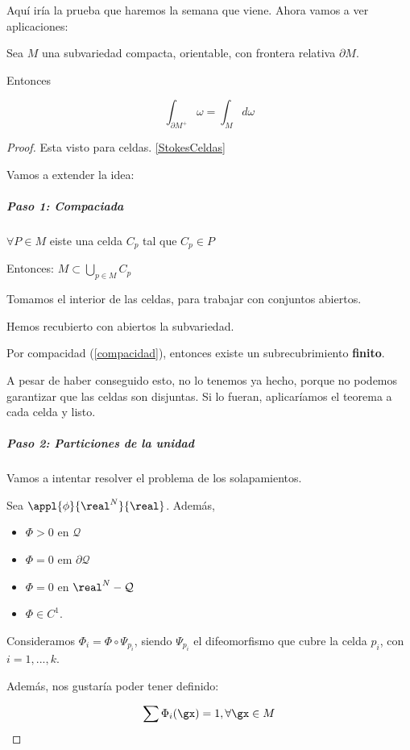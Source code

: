 Aquí iría la prueba que haremos la semana que viene. Ahora vamos a ver aplicaciones:



\begin{theorem}
Sea $M$ una subvariedad compacta, orientable, con frontera relativa $\partial  M$.

Entonces

\[\int_{\partial  M^+}\omega = \int_M d\omega \]

\end{theorem}

\begin{proof}
Esta visto para celdas.
\ref{StokesCeldas}

Vamos a extender la idea:


\subparagraph{Paso 1: Compaciada}
$\forall P\in M$ eiste una celda $C_p$ tal que $C_p\in P$

Entonces: $M\subset \displaystyle\bigcup_{p\in M} C_p$

Tomamos el interior de las celdas, para trabajar con conjuntos abiertos.

Hemos recubierto con abiertos la subvariedad.

Por compacidad (\ref{compacidad}), entonces existe un subrecubrimiento \textbf{finito}.

A pesar de haber conseguido esto, no lo tenemos ya hecho, porque no podemos garantizar que las celdas son disjuntas. Si lo fueran, aplicaríamos el teorema a cada celda y listo.

\subparagraph{Paso 2: Particiones de la unidad}

Vamos a intentar resolver el problema de los solapamientos.

Sea $\appl{\phi}{\real^N}{\real}$. Además, 
\begin{itemize}
\item $\Phi>0$ en $\mathcal{Q}$
\item $\Phi = 0$ em $\partial  \mathcal{Q}$
\item $\Phi = 0$ en $\real^N-\mathcal{Q}$
\item $\Phi\in C^1$.
\end{itemize}

Consideramos $\Phi_i = \Phi\circ\Psi_{p_i}$, siendo $\Psi_{p_i}$ el difeomorfismo que cubre la celda $p_i$, con $i=1,...,k$.

Además, nos gustaría poder tener definido:

\[\displaystyle \sum \Phi_{i}(\gx) = 1,\forall \gx \in M\]


\end{proof}
